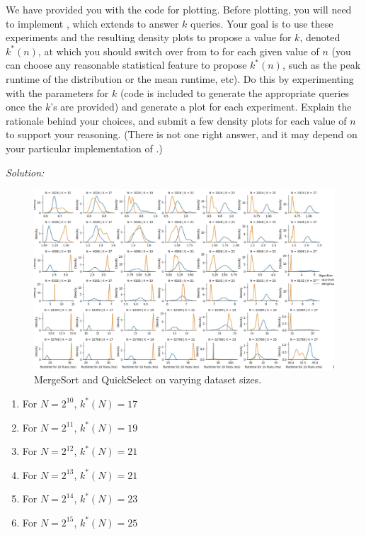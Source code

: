 \documentclass[11pt]{article}
\begin{document}
\begin{enumerate}
\begin{enumerate}
        We have provided you with the code for plotting. Before plotting, you will need to implement \MergeSortSelect{}, which extends \MergeSort{} to answer $k$ queries. Your goal is to use these experiments and the resulting density plots to propose a value for $k$, denoted $k^*(n)$, at which you should switch over from \QuickSelect{} to \MergeSortSelect{} for each given value of $n$ (you can choose any reasonable statistical feature to propose $k^*(n)$, such as the peak runtime of the distribution or the mean runtime, etc). Do this by experimenting with the parameters for $k$ (code is included to generate the appropriate queries once the $k$'s are provided) and generate a plot for each experiment.  Explain the rationale behind your choices, and submit a few density plots for each value of $n$ to support your reasoning.  (There is not one right answer, and it may depend on your particular implementation of \QuickSelect{}.)

        \textit{Solution:}
        \begin{figure}[H]
            \centering
            \includegraphics[width=\textwidth]{graph.png}
            \caption{MergeSort and QuickSelect on varying dataset sizes.}
            \label{fig:graph}
        \end{figure}
        
        \begin{enumerate}
            \item For \( N = 2^{10} \), \( k^*(N) = 17 \)
            \item For \( N = 2^{11} \), \( k^*(N) = 19 \)
            \item For \( N = 2^{12} \), \( k^*(N) = 21 \)
            \item For \( N = 2^{13} \), \( k^*(N) = 21 \)
            \item For \( N = 2^{14} \), \( k^*(N) = 23 \)
            \item For \( N = 2^{15} \), \( k^*(N) = 25 \)
        \end{enumerate}
        

\end{enumerate}
\end{enumerate}
\end{document}
